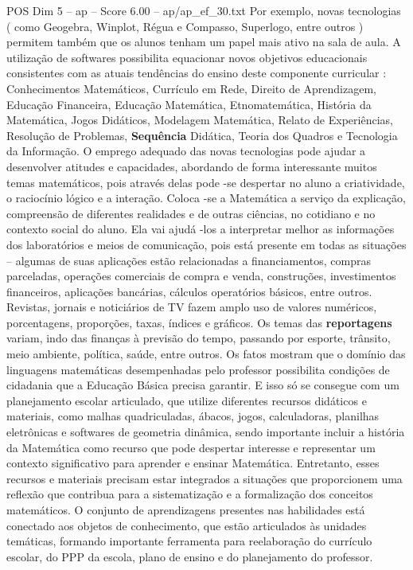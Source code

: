 \begin{textsample}{POS Dim 5 – ap – Score 6.00 – ap/ap\_ef\_30.txt}
Por exemplo, novas tecnologias ( como Geogebra, Winplot, Régua e Compasso, Superlogo, entre outros ) permitem também que os alunos tenham um papel mais ativo na sala de aula.
A utilização de softwares possibilita equacionar novos objetivos educacionais consistentes com as atuais tendências do ensino deste componente curricular : Conhecimentos Matemáticos, Currículo em Rede, Direito de Aprendizagem, Educação Financeira, Educação Matemática, Etnomatemática, História da Matemática, Jogos Didáticos, Modelagem Matemática, Relato de Experiências, Resolução de Problemas, \textbf{Sequência} Didática, Teoria dos Quadros e Tecnologia da Informação.
O emprego adequado das novas tecnologias pode ajudar a desenvolver atitudes e capacidades, abordando de forma interessante muitos temas matemáticos, pois através delas pode -se despertar no aluno a criatividade, o raciocínio lógico e a interação.
Coloca -se a Matemática a serviço da explicação, compreensão de diferentes realidades e de outras ciências, no cotidiano e no contexto social do aluno.
Ela vai ajudá -los a interpretar melhor as informações dos laboratórios e meios de comunicação, pois está presente em todas as situações – algumas de suas aplicações estão relacionadas a financiamentos, compras parceladas, operações comerciais de compra e venda, construções, investimentos financeiros, aplicações bancárias, cálculos operatórios básicos, entre outros.
Revistas, jornais e noticiários de TV fazem amplo uso de valores numéricos, porcentagens, proporções, taxas, índices e gráficos.
Os temas das \textbf{reportagens} variam, indo das finanças à previsão do tempo, passando por esporte, trânsito, meio ambiente, política, saúde, entre outros.
Os fatos mostram que o domínio das linguagens matemáticas desempenhadas pelo professor possibilita condições de cidadania que a Educação Básica precisa garantir.
E isso só se consegue com um planejamento escolar articulado, que utilize diferentes recursos didáticos e materiais, como malhas quadriculadas, ábacos, jogos, calculadoras, planilhas eletrônicas e softwares de geometria dinâmica, sendo importante incluir a história da Matemática como recurso que pode despertar interesse e representar um contexto significativo para aprender e ensinar Matemática.
Entretanto, esses recursos e materiais precisam estar integrados a situações que proporcionem uma reflexão que contribua para a sistematização e a formalização dos conceitos matemáticos.
O conjunto de aprendizagens presentes nas habilidades está conectado aos objetos de conhecimento, que estão articulados às unidades temáticas, formando importante ferramenta para reelaboração do currículo escolar, do PPP da escola, plano de ensino e do planejamento do professor.

\end{textsample}
